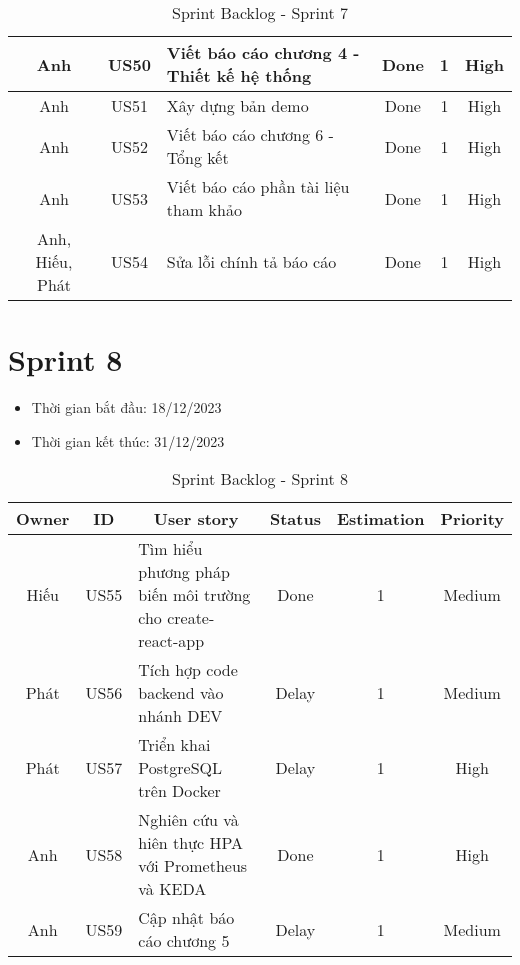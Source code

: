 \begin{table}[H]
\begin{tabular}{|c|c|m{6cm}|c|c|c|}
    Anh         & US50        & Viết báo cáo chương 4 - Thiết kế hệ thống                    & Done            & 1                   & High         \\ \hline
    Anh          & US51        & Xây dựng bản demo                     & Done            & 1                   & High         \\ \hline
    Anh         & US52        & Viết báo cáo chương 6 - Tổng kết                     & Done            & 1                   & High         \\ \hline
    Anh         & US53        & Viết báo cáo phần tài liệu tham khảo                    & Done            & 1                   & High         \\ \hline
    Anh, Hiếu, Phát          & US54        & Sửa lỗi chính tả báo cáo                     & Done            & 1                   & High         \\ \hline
    \end{tabular}
    \caption{Sprint Backlog - Sprint 7}
    \label{tab:sprint-7}
\end{table}
\section{Sprint 8}
\begin{itemize}
    \item Thời gian bắt đầu: 18/12/2023
    \item Thời gian kết thúc: 31/12/2023
\end{itemize}
\begin{table}[H]
    \begin{tabular}{|c|c|m{6cm}|c|c|c|}
    \hline
    \textbf{Owner} & \textbf{ID} & \multicolumn{1}{c|}{\textbf{User story}}                                & \textbf{Status} & \textbf{Estimation} & \textbf{Priority} \\ \hline
    Hiếu         & US55        & Tìm hiểu phương pháp biến môi trường cho create-react-app                     & Done            & 1                   & Medium         \\ \hline
    Phát        & US56        & Tích hợp code backend vào nhánh DEV                     & Delay            & 1                   & Medium         \\ \hline
    Phát          & US57        & Triển khai PostgreSQL trên Docker                   & Delay            & 1                   & High         \\ \hline
    Anh         & US58        & Nghiên cứu và hiên thực HPA với Prometheus và KEDA                    & Done            & 1                   & High         \\ \hline
    Anh          & US59        & Cập nhật báo cáo chương 5                    & Delay            & 1                   & Medium         \\ \hline
    \end{tabular}
    \caption{Sprint Backlog - Sprint 8}
    \label{tab:sprint-8}
\end{table}
